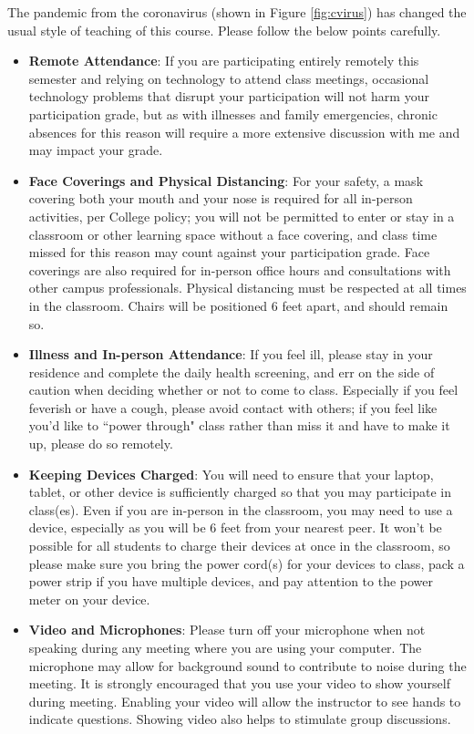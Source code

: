 \documentclass[11pt]{article} %
\begin{document}
The pandemic from the coronavirus (shown in Figure \ref{fig:cvirus}) has changed the usual style of teaching of this course. Please follow the below points carefully. 
\begin{itemize}

\item \textbf{Remote Attendance}:
If you are participating entirely remotely this semester and relying on technology to attend class meetings, occasional technology problems that disrupt your participation will not harm your participation grade, but as with illnesses and family emergencies, chronic absences for this reason will require a more extensive discussion with me and may impact your grade.

\item \textbf{Face Coverings and Physical Distancing}:
For your safety, a mask covering both your mouth and your nose is required for all in-person activities, per College policy; you will not be permitted to enter or stay in a classroom or other learning space without a face covering, and class time missed for this reason may count against your participation grade. Face coverings are also required for in-person office hours and consultations with other campus professionals. Physical distancing must be respected at all times in the classroom. Chairs will be positioned 6 feet apart, and should remain so.


\item \textbf{Illness and In-person Attendance}:
If you feel ill, please stay in your residence and complete the daily health screening, and err on the side of caution when deciding whether or not to come to class. Especially if you feel feverish or have a cough, please avoid contact with others; if you feel like you'd like to ``power through" class rather than miss it and have to make it up, please do so remotely. 

\item \textbf{Keeping Devices Charged}:
You will need to ensure that your laptop, tablet, or other device is sufficiently charged so that you may participate in class(es). Even if you are in-person in the classroom, you may need to use a device, especially as you will be 6 feet from your nearest peer. It won’t be possible for all students to charge their devices at once in the classroom, so please make sure you bring the power cord(s) for your devices to class, pack a power strip if you have multiple devices, and pay attention to the power meter on your device. 

\item \textbf{Video and Microphones}:
Please turn off your microphone when not speaking during any meeting where you are using your computer. The microphone may allow for background sound to contribute to noise during the meeting. It is strongly encouraged that you use your video to show yourself during meeting. Enabling your video will allow the instructor to see hands to indicate questions. Showing video also helps to stimulate group discussions.
\end{itemize}
\end{document}
